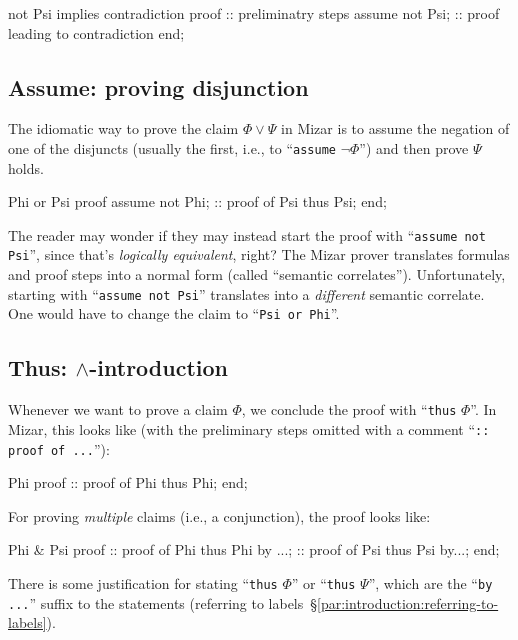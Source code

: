 \begin{mizar}
not Psi implies contradiction
proof
  :: preliminatry steps
  assume not Psi;
  :: proof leading to contradiction
end;
\end{mizar}

\subsection{Assume: proving disjunction}
The idiomatic way to prove the claim $\Phi\lor\Psi$ in Mizar is to
assume the negation of one of the disjuncts (usually the first, i.e.,
to ``\lstinline{assume} $\neg\Phi$'') and then prove $\Psi$ holds.
\begin{mizar}
Phi or Psi
proof
  assume not Phi;
  :: proof of Psi
  thus Psi;
end;
\end{mizar}

\begin{ddanger}
  The reader may wonder if they may instead start the proof with
  ``\lstinline{assume not Psi}'', since that's \emph{logically equivalent}, right?
  The Mizar prover translates formulas and proof steps into a normal
  form (called ``semantic correlates'').
  Unfortunately, starting with ``\lstinline{assume not Psi}'' translates into
  a \emph{different} semantic correlate. One would have to change the
  claim to ``\lstinline{Psi or Phi}''.
\end{ddanger}

\subsection{Thus: $\land$-introduction}
Whenever we want to prove a claim $\Phi$, we conclude the proof with
``\texttt{thus} $\Phi$''. In Mizar, this looks like (with the
preliminary steps omitted with a comment ``\lstinline{:: proof of ...}''):

\begin{mizar}
Phi
proof
  :: proof of Phi
  thus Phi;
end;
\end{mizar}

For proving \emph{multiple} claims (i.e., a conjunction), the proof
looks like:

\begin{mizar}
Phi & Psi
proof
  :: proof of Phi
  thus Phi by ...;
  :: proof of Psi
  thus Psi by...;
end;
\end{mizar}
There is some justification for stating ``\lstinline{thus} $\Phi$'' or
``\lstinline{thus} $\Psi$'', which are the ``\lstinline{by ...}'' suffix to the
statements (referring to labels~\S\ref{par:introduction:referring-to-labels}).

